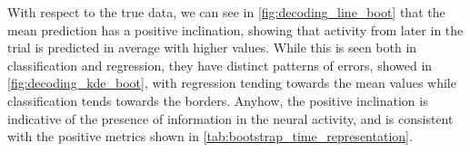     With respect to the true data, we can see in \ref{fig:decoding_line_boot} that the mean prediction has a positive inclination, showing that activity from later in the trial is predicted in average with higher values. While this is seen both in classification and regression, they have distinct patterns of errors, showed in \ref{fig:decoding_kde_boot}, with regression tending towards the mean values while classification tends towards the borders. Anyhow, the positive inclination is indicative of the presence of information in the neural activity, and is consistent with the positive metrics shown in \ref{tab:bootstrap_time_representation}.

